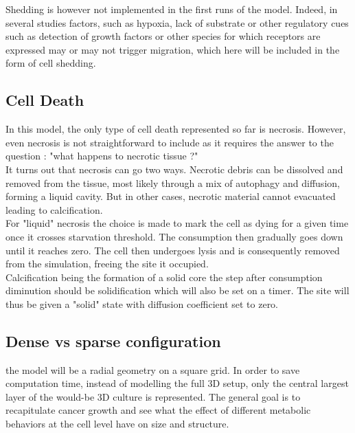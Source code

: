 \documentclass[11pt,a4paper]{article}
\begin{document}

Shedding is however not implemented in the first runs of the model. Indeed, in several studies factors, such as hypoxia, lack of substrate or other regulatory cues such as detection of growth factors or other species for which receptors are expressed may or may not trigger migration, which here will be included in the form of cell shedding.\\

\subsection{Cell Death}
In this model, the only type of cell death represented so far is necrosis. However, even necrosis is not straightforward to include as it requires the answer to the question : "what happens to necrotic tissue ?"\\

It turns out that necrosis can go two ways. Necrotic debris can be dissolved and removed from the tissue, most likely through a mix of autophagy and diffusion, forming a liquid cavity. But in other cases, necrotic material cannot evacuated leading to calcification.\cite{Thim2010}\cite{YuMi2017}\\

For "liquid" necrosis the choice is made to mark the cell as dying for a given time once it crosses starvation threshold. The consumption then gradually goes down until it reaches zero. The cell then undergoes lysis and is consequently removed from the simulation, freeing the site it occupied.\\

Calcification being the formation of a solid core the step after consumption diminution should be solidification which will also be set on a timer. The site will thus be given a "solid" state with diffusion coefficient set to zero.\\

\subsection{Dense vs sparse configuration}
the model will be a radial geometry on a square grid. In order to save computation time, instead of modelling the full 3D setup, only the central largest layer of the would-be 3D culture is represented.  The general goal is to recapitulate cancer growth and see what the effect of different metabolic behaviors at the cell level have on size and structure.\\
\end{document}

